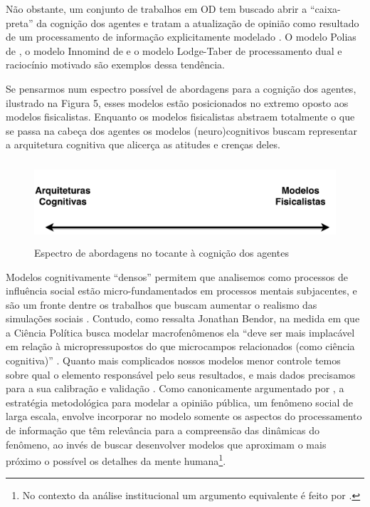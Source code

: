 Não obstante, um conjunto de trabalhos em OD tem buscado abrir a ``caixa-preta''
da cognição dos agentes e tratam a atualização de opinião como resultado de um
processamento de informação explicitamente modelado \cite{flache2017,
  jager2017}. O modelo Polias de , o modelo
Innomind de  e o modelo Lodge-Taber
\cite{kim2010computational,kim2011model} de processamento dual e raciocínio
motivado são exemplos dessa tendência.

Se pensarmos num espectro possível de abordagens para a cognição dos agentes,
ilustrado na Figura 5, esses modelos estão posicionados no extremo oposto aos
modelos fisicalistas. Enquanto os modelos fisicalistas abstraem totalmente o que
se passa na cabeça dos agentes os modelos (neuro)cognitivos buscam representar a
arquitetura cognitiva que alicerça as atitudes e crenças
deles\cite{kim2010computational}.


\begin{figure}[H]
  \centering
  \includegraphics[width = \textwidth, height = 3cm]{ims/line.pdf}
  \caption{Espectro de abordagens no tocante à cognição dos agentes}
  \label{fig5}
\end{figure}

Modelos cognitivamente ``densos'' permitem que analisemos como processos de
influência social estão micro-fundamentados em processos mentais subjacentes, e
são um fronte dentre os trabalhos que buscam aumentar o realismo das simulações
sociais \cite{jager2017,epstein2014agent_zero, conte2013minding}. Contudo, como
ressalta Jonathan Bendor, na medida em que a Ciência Política busca modelar
macrofenômenos ela ``deve ser mais implacável em relação à micropressupostos do
que microcampos relacionados (como ciência cognitiva)''
\cite[p.45]{bendor2010bounded}. Quanto mais complicados nossos modelos menor
controle temos sobre qual o elemento responsável pelo seus resultados, e mais
dados precisamos para a sua calibração e validação \cite{de2005computational}.
Como canonicamente argumentado por , a estratégia
metodológica para modelar a opinião pública, um fenômeno social de larga escala,
envolve incorporar no modelo somente os aspectos do processamento de informação
que têm relevância para a compreensão das dinâmicas do fenômeno, ao invés de
buscar desenvolver modelos que aproximam o mais próximo o possível os detalhes
da mente humana\footnote{No contexto da análise institucional um argumento
  equivalente é feito por .}.


